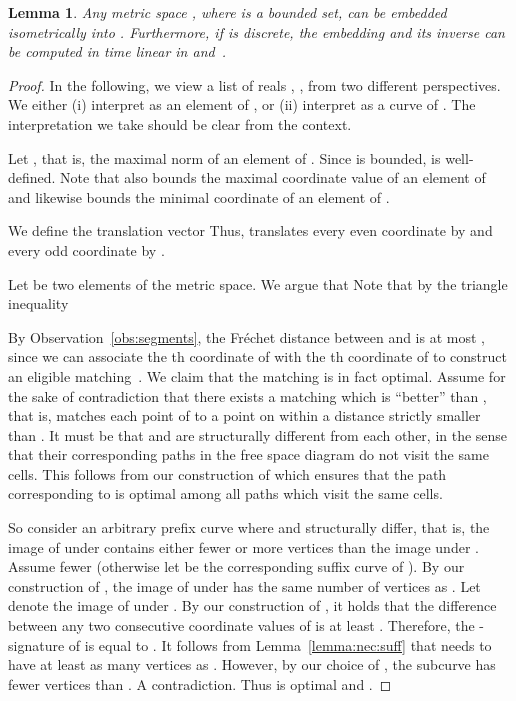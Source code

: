 \documentclass[11pt, letter]{article}
\newtheorem{lemma}[theorem]{Lemma}
\newcommand{\lemlab}[1]{\label{lemma:#1}}
\newcommand{\lemref}[1]{Lemma~\ref{lemma:#1}}
\newcommand{\obsref}[1]{Observation~\ref{obs:#1}}
\newcommand{\Frechet}{Fr\'echet\xspace}
\begin{document}
\begin{lemma}\lemlab{embedding}
Any metric space , where  is a bounded set, can be embedded
isometrically into . Furthermore, if  is discrete, the embedding
and its inverse can be computed in time linear in  and~.  \end{lemma}
\begin{proof}
In the following, we view a list of reals , , 
from two different perspectives. We either (i) interpret  as an element of , 
or (ii) interpret  as a curve of .
The interpretation we take should be clear from the context. 
 
Let , that is, the maximal norm of an
element of .  Since  is bounded,  is well-defined. Note that
 also bounds the maximal coordinate value of an element of  and
likewise  bounds the minimal coordinate of an element of .  

We define the
translation vector  
Thus,  translates every even coordinate by  and every odd
coordinate by . 

Let  be two elements of the metric space. 
We argue that 
Note that by the triangle inequality 


By \obsref{segments}, the \Frechet distance between 
and  is at most , since we can associate the
th coordinate of  with the th coordinate of  to construct an
eligible matching~.  We claim that the matching  is in fact optimal.
Assume for the sake of contradiction that there exists a matching  which is
``better'' than , that is,  matches each point of  to a
point on  within a distance strictly smaller than .
It must be that  and  are structurally different from each other, in the
sense that their corresponding paths in the free space diagram do not visit the
same cells. This follows from our construction of  which ensures that the
path corresponding to  is optimal among all paths which visit the same cells.

So consider an arbitrary prefix curve  where  and 
structurally differ, that is, the image of  under  contains
either fewer or more vertices than the image under .
Assume fewer (otherwise let  be the corresponding suffix curve of
).  By our construction of , the image of  under
 has the same number of vertices as .  Let  denote
the image of  under .   
By our construction of , it holds that the difference between 
any two consecutive coordinate values of  is at least .  
Therefore, the -signature of  is equal to .
It follows from \lemref{nec:suff} that  needs to have at least as
many vertices as . However, by our choice of , the subcurve
 has fewer vertices than . A contradiction.
Thus  is optimal and .
\end{proof}
\end{document}
